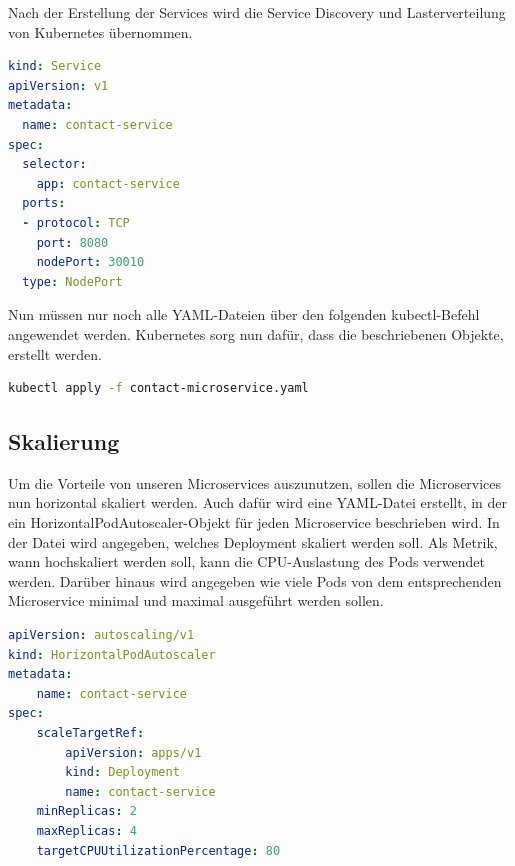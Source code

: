 Nach der Erstellung der Services wird die Service Discovery und Lasterverteilung von Kubernetes übernommen. 

\begin{lstlisting}[language=YAML, caption=Befehl , captionpos=b]
kind: Service
apiVersion: v1
metadata:
  name: contact-service
spec:
  selector:
    app: contact-service
  ports:
  - protocol: TCP
    port: 8080
    nodePort: 30010
  type: NodePort
\end{lstlisting}

Nun müssen nur noch alle YAML-Dateien über den folgenden kubectl-Befehl angewendet werden. Kubernetes sorg nun dafür, dass die beschriebenen Objekte, erstellt werden.

\begin{lstlisting}[language=bash, caption=Befehl , captionpos=b]
kubectl apply -f contact-microservice.yaml
\end{lstlisting}

\subsection{Skalierung}

Um die Vorteile von unseren Microservices auszunutzen, sollen die Microservices nun horizontal skaliert werden. Auch dafür wird eine YAML-Datei erstellt, in der ein HorizontalPodAutoscaler-Objekt für jeden Microservice beschrieben wird. In der Datei wird angegeben, welches Deployment skaliert werden soll. Als Metrik, wann hochskaliert werden soll, kann die CPU-Auslastung des Pods verwendet werden. Darüber hinaus wird angegeben wie viele Pods von dem entsprechenden Microservice minimal und maximal ausgeführt werden sollen.

\begin{lstlisting}[language=YAML, caption=Befehl , captionpos=b]
apiVersion: autoscaling/v1
kind: HorizontalPodAutoscaler
metadata:
    name: contact-service
spec:
    scaleTargetRef:
        apiVersion: apps/v1
        kind: Deployment
        name: contact-service
    minReplicas: 2
    maxReplicas: 4
    targetCPUUtilizationPercentage: 80
\end{lstlisting}
